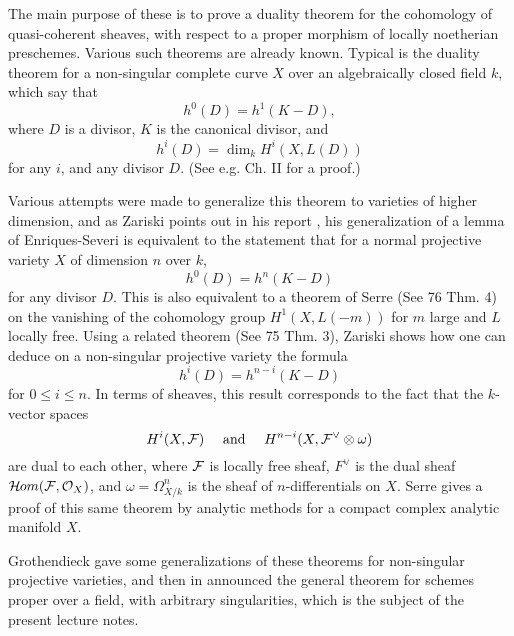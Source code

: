 The main purpose of these is to prove a duality theorem for the cohomology of quasi-coherent sheaves, with respect to a proper morphism of locally noetherian preschemes. Various such theorems are already known. Typical is the duality theorem for a non-singular complete curve $X$ over an algebraically closed field $k$, which say that
\[h^0(D)=h^1(K-D),\]
where $D$ is a divisor, $K$ is the canonical divisor, and 
\[h^{i}(D)=\dim_k H^i(X,L(D))\]
for any $i$, and any divisor $D$. (See e.g. \cite{s1959} Ch. II for a proof.) \par

Various attempts were made to generalize this theorem to varieties of higher dimension, and as Zariski points out in his report \cite{report1956}, his generalization of a lemma of Enriques-Severi \cite{z1952} is equivalent to the statement that for a normal projective variety $X$ of dimension $n$ over $k$,
\[h^0(D)=h^n(K-D)\]
for any divisor $D$. This is also equivalent to a theorem of Serre (See \cite{fac} 76 Thm. 4) on the vanishing of the cohomology group $H^1(X,L(-m))$ for $m$ large and $L$ locally free. Using a related theorem (See \cite{fac} 75 Thm. 3), Zariski shows how one can deduce on a non-singular projective variety the formula
\[h^i(D)=h^{n-i}(K-D)\]
for $0\leq i\leq n$. In terms of sheaves, this result corresponds to the fact that the $k$-vector spaces
\[H^i(X,\mathcal{F})\quad \textrm{ and } \quad H^{n-i}(X,\mathcal{F}^{\vee}\otimes \omega)\]
are dual to each other, where $\mathcal{F}$ is locally free sheaf, $F^{\vee}$ is the dual sheaf $\mathcal{H}\kern -.5pt om(\mathcal{F},\mathcal{O}_X)$, and $\omega=\Omega^n_{X/k}$ is the sheaf of $n$-differentials on $X$. Serre gives a proof of this same theorem by analytic methods for a compact complex analytic manifold $X$.\par

Grothendieck gave some generalizations of these theorems for non-singular projective varieties, and then in \cite{} announced the general theorem for schemes proper over a field, with arbitrary singularities, which is the subject of the present lecture notes.\par 


